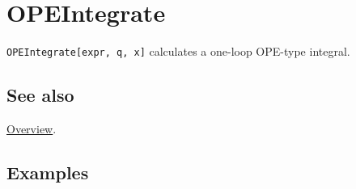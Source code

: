 \documentclass[../FeynCalcManual.tex]{subfiles}
\begin{document}
\hypertarget{opeintegrate}{%
\section{OPEIntegrate}\label{opeintegrate}}

\texttt{OPEIntegrate[\allowbreak{}expr,\ \allowbreak{}q,\ \allowbreak{}x]}
calculates a one-loop OPE-type integral.

\subsection{See also}

\hyperlink{toc}{Overview}.

\subsection{Examples}
\end{document}
